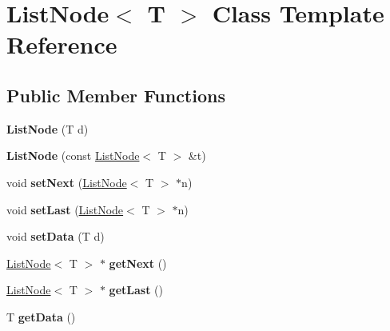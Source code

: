 \hypertarget{classListNode}{}\section{List\+Node$<$ T $>$ Class Template Reference}
\label{classListNode}
\subsection*{Public Member Functions}
\begin{DoxyCompactItemize}
\item 
{\bfseries List\+Node} (T d)\hypertarget{classListNode_ac1cb6066fe44fe94533f9e382e5156e5}{}\label{classListNode_ac1cb6066fe44fe94533f9e382e5156e5}

\item 
{\bfseries List\+Node} (const \hyperlink{classListNode}{List\+Node}$<$ T $>$ \&t)\hypertarget{classListNode_a74db4c29eed23aa89722a71c47bae8b2}{}\label{classListNode_a74db4c29eed23aa89722a71c47bae8b2}

\item 
void {\bfseries set\+Next} (\hyperlink{classListNode}{List\+Node}$<$ T $>$ $\ast$n)\hypertarget{classListNode_a42280f04e0451c56e8ad226f3641b87d}{}\label{classListNode_a42280f04e0451c56e8ad226f3641b87d}

\item 
void {\bfseries set\+Last} (\hyperlink{classListNode}{List\+Node}$<$ T $>$ $\ast$n)\hypertarget{classListNode_a1bcead45acad54ca3c3bff05244bd5a4}{}\label{classListNode_a1bcead45acad54ca3c3bff05244bd5a4}

\item 
void {\bfseries set\+Data} (T d)\hypertarget{classListNode_ac5aa9d4b9d3ae0f7d438959a4086e596}{}\label{classListNode_ac5aa9d4b9d3ae0f7d438959a4086e596}

\item 
\hyperlink{classListNode}{List\+Node}$<$ T $>$ $\ast$ {\bfseries get\+Next} ()\hypertarget{classListNode_a767225e55adf55e1625953c7491e89c2}{}\label{classListNode_a767225e55adf55e1625953c7491e89c2}

\item 
\hyperlink{classListNode}{List\+Node}$<$ T $>$ $\ast$ {\bfseries get\+Last} ()\hypertarget{classListNode_a62aa38ae43c6ad59868eb5732249b88f}{}\label{classListNode_a62aa38ae43c6ad59868eb5732249b88f}

\item 
T {\bfseries get\+Data} ()\hypertarget{classListNode_a6f0f61baa88716c6ef8a6cc58bc5f933}{}\label{classListNode_a6f0f61baa88716c6ef8a6cc58bc5f933}


\end{DoxyCompactItemize}
